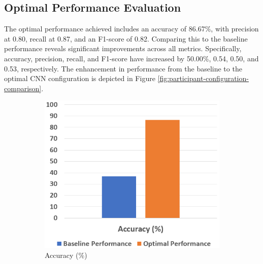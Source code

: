 \documentclass{l4proj}
\begin{document}
\subsection{Optimal Performance Evaluation}
The optimal performance achieved includes an accuracy of 86.67\%, with precision at 0.80, recall at 0.87, and an F1-score of 0.82. Comparing this to the baseline performance reveals significant improvements across all metrics.  Specifically, accuracy, precision, recall, and F1-score have increased by 50.00\%, 0.54, 0.50, and 0.53, respectively. The enhancement in performance from the baseline to the optimal CNN configuration is depicted in Figure \ref{fig:participant-configuration-comparison}.

\begin{figure}[h]
    \centering
    \begin{subfigure}{0.4\textwidth}
        \includegraphics[width=\textwidth]{images/participant-configuration-comparison-barchart1.png}
        \caption{Accuracy (\%)}
        \label{fig:participant-configuration-comparison-barchart1}
    \end{subfigure}
    \qquad
    \begin{subfigure}{0.4\textwidth}

\end{subfigure}
\end{figure}
\end{document}
